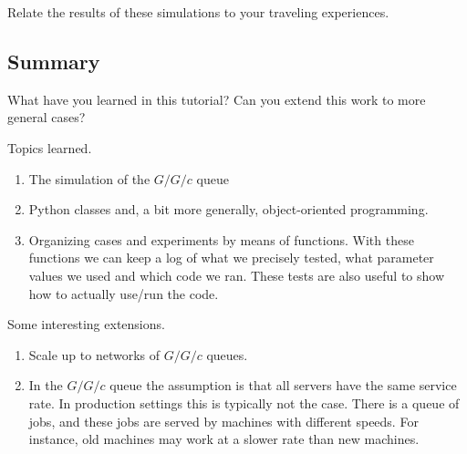 \begin{exercise}
  Relate the results of these simulations to your traveling experiences.
\end{exercise}


\subsection{Summary}
\label{sec:summary-4}


\begin{exercise}
  What have you learned in this tutorial?
 Can you extend this work to more general cases?
\begin{solution}
    Topics learned.
    \begin{enumerate}
    \item The simulation of the $G/G/c$ queue
    \item Python classes and, a bit more generally, object-oriented programming.
    \item Organizing cases and experiments by means of  functions. With these functions we can keep a log of what we precisely tested, what parameter values we used and which code we ran. These tests are also useful to show how to actually use/run the code.
    \end{enumerate}

Some  interesting extensions.
    \begin{enumerate}
    \item   Scale up to networks of $G/G/c$ queues.
    \item In the $G/G/c$ queue the assumption is that all servers have the same service rate.
      In production settings this is typically not the case.
      There is a queue of jobs, and these jobs are served by machines with different speeds.
      For instance, old machines may work at a slower rate than new machines.
    \end{enumerate}
  \end{solution}
\end{exercise}
